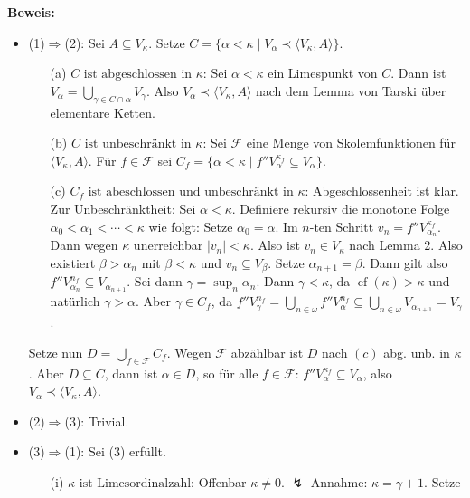 \documentclass[a4paper,fontsize=11pt]{scrartcl}
\newcommand{\cf}{\operatorname{cf}}
\begin{document}
{\bf Beweis:}
\begin{itemize}
\item (1)$\Rightarrow$(2): Sei $A\subseteq V_{\kappa}$. Setze $C=\{\alpha<\kappa\mid V_{\alpha}\prec \langle V_{\kappa}, A\rangle\}$.
  \begin{itemize}
  \item[(a)] $C\mbox{ ist abgeschlossen in }\kappa$: Sei $\alpha <
    \kappa$ ein Limespunkt von $C$.  Dann ist $V_{\alpha} =
    \bigcup_{\gamma\in C\cap\alpha} V_{\gamma}$.  Also $V_{\alpha}
    \prec \langle V_{\kappa}, A\rangle$ nach dem Lemma von Tarski über
    elementare Ketten.
  \item[(b)] $C\mbox{ ist unbeschränkt in }\kappa$: Sei $\mathcal F$
    eine Menge von Skolemfunktionen für $\langle V_{\kappa},
    A\rangle$.  Für $f\in \mathcal F$ sei $C_f = \{\alpha<\kappa\mid
    f''V_{\alpha}^{\kappa_f} \subseteq V_{\alpha}\}$.
  \item[(c)] $C_f\mbox{ ist abeschlossen und unbeschränkt in }\kappa$:
    Abgeschlossenheit ist klar.  Zur Unbeschränktheit: Sei
    $\alpha<\kappa$.  Definiere rekursiv die monotone Folge
    $\alpha_0<\alpha_1<\cdots<\kappa$ wie folgt: Setze
    $\alpha_0=\alpha$.  Im $n$-ten Schritt $v_n=
    f''V_{\alpha_n}^{\kappa_f}$.  Dann wegen $\kappa$ unerreichbar
    $|v_n|<\kappa$.  Also ist $v_n\in V_{\kappa}$ nach Lemma 2.  Also
    existiert $\beta>\alpha_n$ mit $\beta<\kappa$ und $v_n\subseteq
    V_{\beta}$.  Setze $\alpha_{n+1}=\beta$.  Dann gilt also
    $f''V_{\alpha_n}^{n_f}\subseteq V_{\alpha_{n+1}}$.  Sei dann
    $\gamma = \sup_n \alpha_n$.  Dann $\gamma <\kappa$, da
    $\cf(\kappa)>\kappa$ und natürlich $\gamma >\alpha$.  Aber
    $\gamma\in C_f$, da
    $f''V_{\gamma}^{n_f}=\bigcup_{n\in\omega}f''V_{\alpha}^{n_f}
    \subseteq \bigcup_{n\in\omega}V_{\alpha_{n+1}} = V_{\gamma}$.
  \end{itemize}
  Setze nun $D=\bigcup_{f\in \mathcal F} C_f$.  Wegen $\mathcal F$
  abzählbar ist $D$ nach $(c)$ abg. unb. in $\kappa$.  Aber
  $D\subseteq C$, dann ist $\alpha\in D$, so für alle $f\in \mathcal
  F$: $f''V^{\kappa_f}_{\alpha}\subseteq V_{\alpha}$, also
  $V_{\alpha}\prec \langle V_{\kappa}, A\rangle$.
\item (2)$\Rightarrow$(3): Trivial.
\item (3)$\Rightarrow$(1): Sei (3) erfüllt.
  \begin{itemize}
  \item[(i)] $\kappa\mbox{ ist Limesordinalzahl}$: Offenbar
    $\kappa\neq 0$.  $\lightning$-Annahme: $\kappa=\gamma+1$.  Setze

\end{itemize}
\end{itemize}
\end{document}
